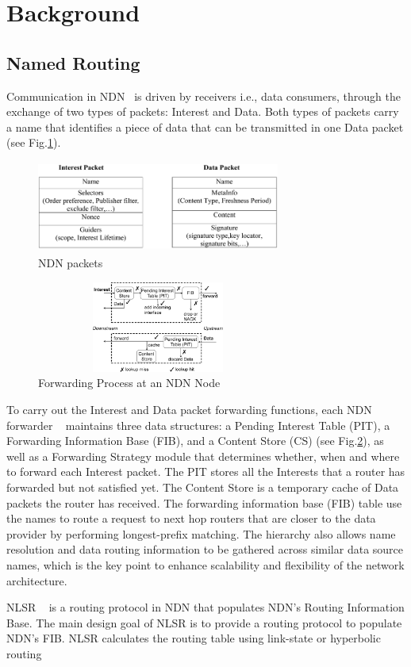 \section{Background}\label{Background}

\subsection{Named Routing}

Communication in NDN~\cite{ndn} is driven by receivers i.e., data consumers, through the exchange of two types of packets: Interest and Data. Both types of packets carry a name that identiﬁes a piece of data that can be transmitted in one Data packet (see Fig.\ref{fig:ndn}).

\begin{figure}
\centering
\includegraphics[height=3cm, width=8cm]{figs/ndn_packet.png}
\caption{\label{fig:ndn}NDN packets~\cite{ndn}}
\end{figure}
 
\begin{figure}
\centering
\includegraphics[height=3cm, width=8cm]{figs/process2.png}
\caption{\label{fig:process2}Forwarding Process at an NDN Node~\cite{ndn}}
\end{figure}

To carry out the Interest and Data packet forwarding functions, each NDN forwarder ~\cite{ndn} maintains three data structures: a Pending Interest Table (PIT), a Forwarding Information Base (FIB), and a Content Store (CS) (see Fig.\ref{fig:process2}), as well as a Forwarding Strategy module that determines whether, when and where to forward each Interest packet. The PIT stores all the Interests that a router has forwarded but not satisfied yet. The Content Store is a temporary cache of Data packets the router has received. The forwarding information base (FIB) table use the names to route a request to next hop routers that are closer to the data provider by performing longest-prefix matching. The hierarchy also allows name resolution and data routing information to be gathered across similar data source names, which is the key point to enhance scalability and flexibility of the network architecture. 

NLSR ~\cite{hoque2013nlsr} is a routing protocol in NDN that populates NDN’s Routing Information Base. The main design goal of NLSR is to provide a routing protocol to populate NDN’s FIB. NLSR calculates the routing table using link-state or hyperbolic routing